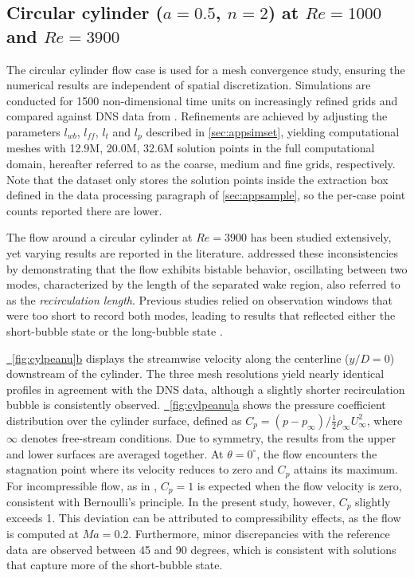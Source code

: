 \documentclass{article}
\newcommand{\subfigref}[2]{\hyperref[#1]{\figureautorefname~\ref*{#1}#2}}
\begin{document}
\subsection*{Circular cylinder ($a = 0.5$, $n = 2$) at $Re  = 1000$ and $Re = 3900$}
The circular cylinder flow case is used for a mesh convergence study, ensuring the numerical results are independent of spatial discretization. Simulations are conducted for 1500 non-dimensional time units on increasingly refined grids and compared against DNS data from \citet{lehmkuhl_low-frequency_2013}. Refinements are achieved by adjusting the parameters $l_{wb}$, $l_{ff}$, $l_t$ and $l_p$ described in \autoref{sec:appsimset}, yielding computational meshes with 12.9M, 20.0M, 32.6M solution points \textcolor{revcolor}{in the full computational domain}, hereafter referred to as the coarse, medium and fine grids, respectively. \textcolor{revcolor}{Note that the dataset only stores the solution points inside the extraction box defined in the data processing paragraph of \autoref{sec:appsample}, so the per-case point counts reported there are lower.}

The flow around a circular cylinder at $Re = 3900$ has been studied extensively, yet varying results are reported in the literature. \citet{lehmkuhl_low-frequency_2013} addressed these inconsistencies by demonstrating that the flow exhibits bistable behavior, oscillating between two modes, characterized by the length of the separated wake region, also referred to as the \textit{recirculation length}. Previous studies relied on observation windows that were too short to record both modes, leading to results that reflected either the short-bubble state \citep{Loureno1993CharacteristicsOT} or the long-bubble state \citep{parnaudeau_experimental_2008}.

\subfigref{fig:cylpeanu}{b} displays the streamwise velocity along the centerline ($y/D=0$) downstream of the cylinder. The three mesh resolutions yield nearly identical profiles in agreement with the DNS data, although a slightly shorter recirculation bubble is consistently observed. \subfigref{fig:cylpeanu}{a} shows the pressure coefficient distribution over the cylinder surface, defined as $C_p = (p - p_\infty) / \frac{1}{2}\rho_\infty U_\infty^2$, where $\infty$ denotes free-stream conditions. Due to symmetry, the results from the upper and lower surfaces are averaged together. At $\theta=0^\circ$, the flow encounters the stagnation point where its velocity reduces to zero and $C_p$ attains its maximum. For incompressible flow, as in \citet{lehmkuhl_low-frequency_2013}, $C_p = 1$ is expected when the flow velocity is zero, consistent with Bernoulli's principle. In the present study, however, $C_p$ slightly exceeds 1. This deviation can be attributed to compressibility effects, as the flow is computed at $Ma = 0.2$. Furthermore, minor discrepancies with the reference data are observed between 45 and 90 degrees, which is consistent with solutions that capture more of the short-bubble state.
\end{document}
